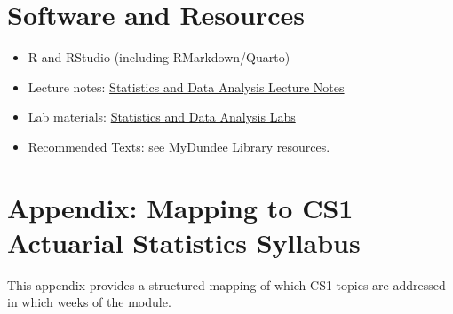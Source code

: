 \documentclass[
  a4paper,
  DIV=11,
  numbers=noendperiod,
  oneside]{scrreprt}
\providecommand{\tightlist}{%
  \setlength{\itemsep}{0pt}\setlength{\parskip}{0pt}}
\theoremstyle{plain}
\theoremstyle{definition}
\theoremstyle{definition}
\theoremstyle{definition}
\theoremstyle{plain}
\theoremstyle{remark}
\begin{document}
\section*{Software and Resources}\label{software-and-resources}


\begin{itemize}
\tightlist
\item
  R and RStudio (including RMarkdown/Quarto)\\
\item
  Lecture notes: \href{https://dundeemath.github.io/MA22004/}{Statistics
  and Data Analysis Lecture Notes}\\
\item
  Lab materials:
  \href{https://dundeemath.github.io/MA22004labs/}{Statistics and Data
  Analysis Labs}\\
\item
  Recommended Texts: see MyDundee Library resources.
\end{itemize}

\section*{Appendix: Mapping to CS1 Actuarial Statistics
Syllabus}\label{appendix-mapping-to-cs1-actuarial-statistics-syllabus}


This appendix provides a structured mapping of which CS1 topics are
addressed in which weeks of the module.
\end{document}
